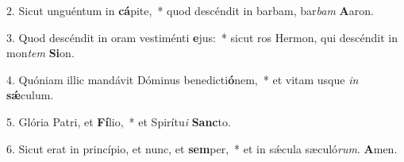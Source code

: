 2. Sicut unguéntum in \textbf{cá}pite,~*  quod descéndit in barbam, bar\textit{bam} \textbf{A}aron.\

3. Quod descéndit in oram vestiménti \textbf{e}jus:~*  sicut ros Hermon, qui descéndit in mon\textit{tem} \textbf{Si}on.\

4. Quóniam illic mandávit Dóminus benedicti\textbf{ó}nem,~*  et vitam usque \textit{in} \textbf{sǽ}culum.\

5. Glória Patri, et \textbf{Fí}lio,~*  et Spirítu\textit{i} \textbf{Sanc}to.\

6. Sicut erat in princípio, et nunc, et \textbf{sem}per,~*  et in sǽcula sæculó\textit{rum}. \textbf{A}men.\

